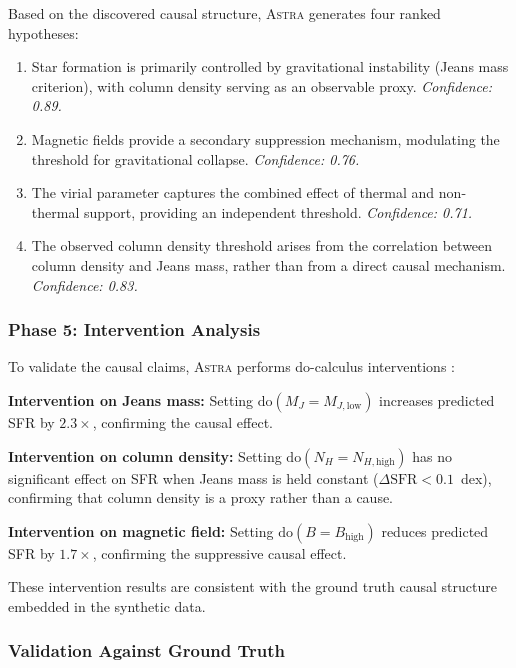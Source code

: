\documentclass[fleqn,usenatbib]{mnras}
\newcommand{\astra}{\textsc{Astra}\xspace}
\begin{document}
Based on the discovered causal structure, \astra generates four ranked hypotheses:
\begin{enumerate}
  \item[(H1)] Star formation is primarily controlled by gravitational instability (Jeans mass criterion), with column density serving as an observable proxy. \emph{Confidence: 0.89.}
  \item[(H2)] Magnetic fields provide a secondary suppression mechanism, modulating the threshold for gravitational collapse. \emph{Confidence: 0.76.}
  \item[(H3)] The virial parameter captures the combined effect of thermal and non-thermal support, providing an independent threshold. \emph{Confidence: 0.71.}
  \item[(H4)] The observed column density threshold arises from the correlation between column density and Jeans mass, rather than from a direct causal mechanism. \emph{Confidence: 0.83.}
\end{enumerate}

\subsubsection{Phase 5: Intervention Analysis}
\label{sec:tc6:phase5}

To validate the causal claims, \astra performs do-calculus interventions \citep{Pearl2009}:

\textbf{Intervention on Jeans mass:} Setting $\mathrm{do}(M_J = M_{J,\mathrm{low}})$ increases predicted SFR by $2.3\times$, confirming the causal effect.

\textbf{Intervention on column density:} Setting $\mathrm{do}(N_H = N_{H,\mathrm{high}})$ has no significant effect on SFR when Jeans mass is held constant ($\Delta\mathrm{SFR} < 0.1$~dex), confirming that column density is a proxy rather than a cause.

\textbf{Intervention on magnetic field:} Setting $\mathrm{do}(B = B_\mathrm{high})$ reduces predicted SFR by $1.7\times$, confirming the suppressive causal effect.

These intervention results are consistent with the ground truth causal structure embedded in the synthetic data.

\subsubsection{Validation Against Ground Truth}
\label{sec:tc6:validation}
\end{document}
